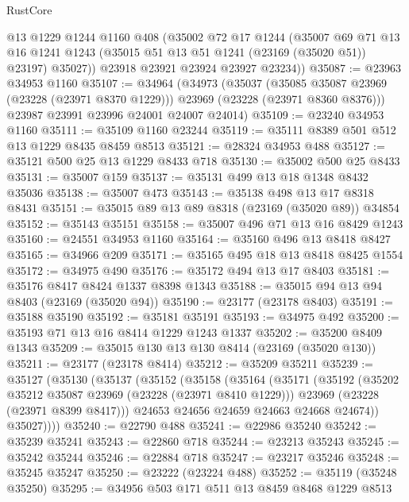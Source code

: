 \begin{lexlean}{RustCore}
\begin{coremodule}
        @13
        @1229
        @1244
        @1160
        @408
        (@35002
          @72
          @17
          @1244
          (@35007
            @69
            @71
            @13
            @16
            @1241
            @1243
            (@35015 @51 @13 @51 @1241 (@23169 (@35020 @51)) @23197)
            @35027))
        @23918
        @23921
        @23924
        @23927
        @23234))
@35087 := @23963 @34953 @1160
@35107 := @34964
    (@34973
      (@35037
        (@35085 @35087 @23969 (@23228 (@23971 @8370 @1229)))
        @23969
        (@23228 (@23971 @8360 @8376)))
      @23987
      @23991
      @23996
      @24001
      @24007
      @24014)
@35109 := @23240 @34953 @1160
@35111 := @35109 @1160 @23244
@35119 := @35111 @8389 @501 @512 @13 @1229 @8435 @8459 @8513
@35121 := @28324 @34953 @488
@35127 := @35121 @500 @25 @13 @1229 @8433 @718
@35130 := @35002 @500 @25 @8433
@35131 := @35007 @159
@35137 := @35131 @499 @13 @18 @1348 @8432 @35036
@35138 := @35007 @473
@35143 := @35138 @498 @13 @17 @8318 @8431
@35151 := @35015 @89 @13 @89 @8318 (@23169 (@35020 @89)) @34854
@35152 := @35143 @35151
@35158 := @35007 @496 @71 @13 @16 @8429 @1243
@35160 := @24551 @34953 @1160
@35164 := @35160 @496 @13 @8418 @8427
@35165 := @34966 @209
@35171 := @35165 @495 @18 @13 @8418 @8425 @1554
@35172 := @34975 @490
@35176 := @35172 @494 @13 @17 @8403
@35181 := @35176 @8417 @8424 @1337 @8398 @1343
@35188 := @35015 @94 @13 @94 @8403 (@23169 (@35020 @94))
@35190 := @23177 (@23178 @8403)
@35191 := @35188 @35190
@35192 := @35181 @35191
@35193 := @34975 @492
@35200 := @35193 @71 @13 @16 @8414 @1229 @1243 @1337
@35202 := @35200 @8409 @1343
@35209 := @35015 @130 @13 @130 @8414 (@23169 (@35020 @130))
@35211 := @23177 (@23178 @8414)
@35212 := @35209 @35211
@35239 := @35127
    (@35130
      (@35137
        (@35152
          (@35158
            (@35164
              (@35171
                (@35192
                  (@35202 @35212 @35087 @23969 (@23228 (@23971 @8410 @1229)))
                  @23969
                  (@23228 (@23971 @8399 @8417)))
                @24653
                @24656
                @24659
                @24663
                @24668
                @24674))
            @35027))))
@35240 := @22790 @488
@35241 := @22986 @35240
@35242 := @35239 @35241
@35243 := @22860 @718
@35244 := @23213 @35243
@35245 := @35242 @35244
@35246 := @22884 @718
@35247 := @23217 @35246
@35248 := @35245 @35247
@35250 := @23222 (@23224 @488)
@35252 := @35119 (@35248 @35250)
@35295 := @34956
    @503
    @171
    @511
    @13
    @8459
    @8468
    @1229
    @8513

\end{coremodule}
\end{lexlean}
